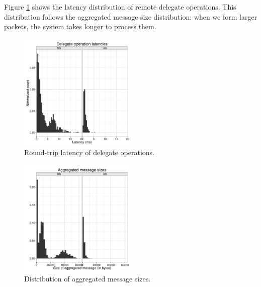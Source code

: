 Figure \ref{fig:grappa-latency} shows the latency distribution of
remote delegate operations. This distribution follows the aggregated
message size distribution: when we form larger packets, the system
takes longer to process them.


\begin{figure}[ht]
    \begin{center}
      \includegraphics[width=0.5\textwidth]{results/histograms/latency_cmb.pdf}
    \end{center}
    \caption{Round-trip latency of delegate operations.}
    \label{fig:grappa-latency}
\end{figure}

\begin{figure}[ht]
    \begin{center}
      \includegraphics[width=0.5\textwidth]{results/histograms/rdma_bytes_sent_histogram_cmb.pdf}
    \end{center}
    \caption{Distribution of aggregated message sizes.}
    \label{fig:grappa-message-size}
\end{figure}



















